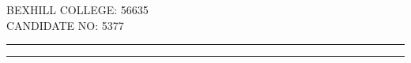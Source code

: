 \begin{titlepage}
	{\large\textsc{BEXHILL COLLEGE: 56635}} \\
	{\large\textsc{CANDIDATE NO: 5377}}
	
	\vspace{0.1\textheight} %
	
	
	\rule{\textwidth}{0.4pt} %
	
	\vspace{2pt}\vspace{-\baselineskip} %
	
	\rule{\textwidth}{1pt} %
	
\end{titlepage}